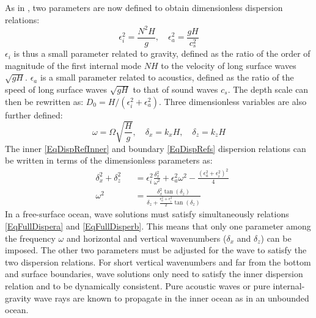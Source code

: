 \documentclass[a4paper,11pt]{article}
\begin{document}
As in \cite{dukowicz_2013}, two parameters are now defined to obtain dimensionless dispersion relations:
%
\begin{equation}
     \epsilon_i^2 =  \frac{N^2 H}{g} 
    ,\quad \epsilon_a^2 = \frac{g H}{c_s^2} 
\end{equation}
%
$\epsilon_i$ is thus a small parameter related to gravity, defined as the ratio of the order of magnitude of the first internal mode $N H$ to the velocity of long surface waves $\sqrt{gH}$. $\epsilon_a$ is a small parameter related to acoustics, defined as the ratio of the speed of long surface waves $\sqrt{gH}$ to that of sound waves $c_s$. The depth scale can then be rewritten as:
%
$D_0=H/(\epsilon_i^2+\epsilon_a^2)$.
%
Three dimensionless variables are also further defined:
%
\begin{equation}
\omega = \Omega \sqrt{\frac{H}{g}}
    ,\quad \delta_x = k_x H
    ,\quad \delta_z = k_z H
\end{equation}
%
%
The inner \ref{EqDispRefInner} and boundary \ref{EqDispRefs} dispersion relations can be written in terms of the dimensionless parameters as:
%
\begin{subequations}
	\label{EqFullDisper}
	\begin{alignat}{2}	
	\label{EqFullDispera}
 		& \delta_x^2+\delta_z^2 &&=\epsilon_i^2\frac{\delta_x^2}
 			{\omega^2}+\epsilon_a^2\omega^2-\frac{(\epsilon_a^2+\epsilon_i^2)^2}{4}\\[3mm]
		\label{EqFullDisperb}
		& \omega^2 &&=\frac{\delta_x^2\tan(\delta_z)}
		{\delta_z+\frac{\epsilon_a^2+\epsilon_i^2}			{2}\tan(\delta_z)}
	\end{alignat}
\end{subequations}
%
In a free-surface ocean, wave solutions must satisfy simultaneously relations \ref{EqFullDispera} and \ref{EqFullDisperb}. This means that only one parameter among the frequency $\omega$ and horizontal and vertical wavenumbers ($\delta_x$ and $\delta_z$) can be imposed. The other two parameters must be adjusted for the wave to satisfy the two dispersion relations. For short vertical wavenumbers and far from the bottom and surface boundaries, wave solutions only need to satisfy the inner dispersion relation and to be dynamically consistent. Pure acoustic waves or pure internal-gravity wave rays are known to propagate in the inner ocean as in an unbounded ocean.
\end{document}
